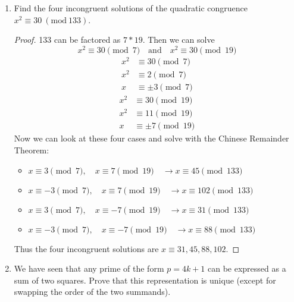 \documentclass[11pt]{article}
\theoremstyle{definition}
\newcommand{\Mod}[1]{\ (\mathrm{mod}\ #1)}
\begin{document}
\begin{enumerate}
    \item Find the four incongruent solutions of the quadratic congruence $x^2 \equiv 30 \Mod{133}$.
    \begin{proof}
        133 can be factored as $7*19$. Then we can solve
        \[
            x^2 \equiv 30 \pmod{7} \quad\text{and}\quad
            x^2 \equiv 30 \pmod{19} 
        \]
        \begin{align*}
            x^2 &\equiv 30 \pmod{7} \\
            x^2 &\equiv 2 \pmod{7} \\
            x &\equiv \pm 3\pmod{7}
        \end{align*}
        \begin{align*}
            x^2 &\equiv 30 \pmod{19} \\
            x^2 &\equiv 11 \pmod{19} \\
            x &\equiv \pm 7\pmod{19}
        \end{align*}
        Now we can look at these four cases and solve with the Chinese Remainder Theorem:
        \begin{itemize}
            \item $x\equiv 3\pmod{7},  \quad x\equiv 7\pmod{19} \quad\rightarrow x\equiv 45\pmod{133}$
            \item $x\equiv -3\pmod{7}, \quad x\equiv 7\pmod{19} \quad\rightarrow x\equiv 102\pmod{133}$
            \item $x\equiv 3\pmod{7},  \quad x\equiv -7\pmod{19} \quad\rightarrow x\equiv 31\pmod{133}$
            \item $x\equiv -3\pmod{7}, \quad x\equiv -7\pmod{19} \quad\rightarrow x\equiv 88\pmod{133}$
        \end{itemize}
        Thus the four incongruent solutions are $x \equiv 31, 45, 88, 102$.
    \end{proof}

    \item We have seen that any prime of the form $p = 4k+1$ can be expressed as a sum of two squares. Prove that this representation is unique (except for swapping the order of the two summands).


\end{enumerate}
\end{document}
